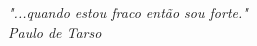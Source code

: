 

\chapter*{}
\begin{flushright}		
\vfill				    

\it "...quando estou fraco então sou forte."\\
\it Paulo de Tarso\\

\end{flushright}
